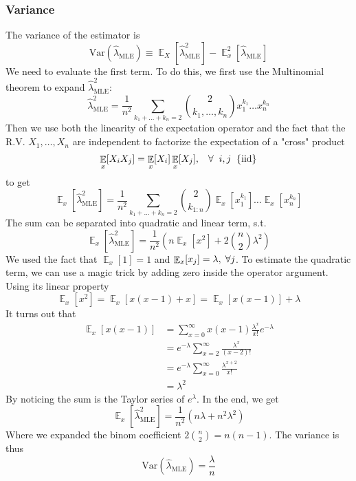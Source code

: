 \documentclass{article}
\DeclareMathOperator{\E}{\mathbb{E}}
\newcommand{\s}{\hspace{0.1cm}}
\numberwithin{equation}{section}
\newcommand{\mle}[1]{\hat{#1}_{\text{MLE}}}
\begin{document}
\subsubsection{Variance}
The variance of the estimator is
\[
        \text{Var}(\mle{\lambda}) \equiv  \E_X[\mle{\lambda}^2] - \E_x^2[\mle{\lambda}]
\]
We need to evaluate the first term. To do this, we first use the Multinomial 
theorem to expand $\mle{\lambda}^2$:
 \[
         \mle{\lambda}^2 = \frac{1}{n^2} \sum_{k_1 + \dots + k_n = 2} 
         \binom{2}{k_1,\dots,k_n} x_1^{k_1}\dots x_n^{k_n}
\]
Then we use both the linearity of the expectation operator and the fact that 
the R.V. $X_1,\dots,X_n$ are independent to factorize the expectation of a "cross" 
product
 \[
         \E_x[X_iX_j] = \E_x[X_i]\E_x[X_j], \s\s\s \forall \s\s i,j\s \s \{\text{iid}\} 
\]
to get
\[
        \E_x[\mle{\lambda}^2] = \frac{1}{n^2} \sum_{k_1 + \dots + k_n = 2} 
        \binom{2}{k_{1:n}} \E_x[x_1^{k_1}]\dots\E_x[x_n^{k_n}]
\]
The sum can be separated into quadratic and linear term, s.t.
\[
        \E_x[\mle{\lambda}^2] = \frac{1}{n^2}\left( 
                n\E_x[x^2] + 2\binom{n}{2}\lambda^2
        \right) 
\]
We used the fact that $\E_x[1] = 1$ and $\E_x[x_j] = \lambda,\s \forall j$. To estimate 
the quadratic term, we can use a magic trick by adding zero inside 
the operator argument. Using its linear property 
 \[
         \E_x[x^2] = \E_x[x(x - 1) + x] = \E_x[x(x-1)] + \lambda
\]
It turns out that
\begin{align*}
        \E_x[x(x-1)] &= \sum_{x=0}^\infty x(x-1) \frac{\lambda^x}{x!}e^{-\lambda} \\
                     &= e^{-\lambda} \sum_{x=2}^\infty \frac{\lambda^x}{(x-2)!} \\
                     &= e^{-\lambda}  \sum_{x=0}^\infty \frac{\lambda^{x + 2}}{x!} \\
                     &= \lambda^2
\end{align*} 
By noticing the sum is the Taylor series of $e^\lambda$. In the end, we get
 \[
         \E_x[\mle{\lambda}^2] = \frac{1}{n^2}\left( 
         n\lambda + n^2\lambda^2 
         \right) 
\]
Where we expanded the binom coefficient $2\binom{n}{2} = n(n-1)$.
The variance is thus
\[
        \boxed{\text{Var}(\mle{\lambda}) = \frac{\lambda}{n} }
\]
\end{document}
